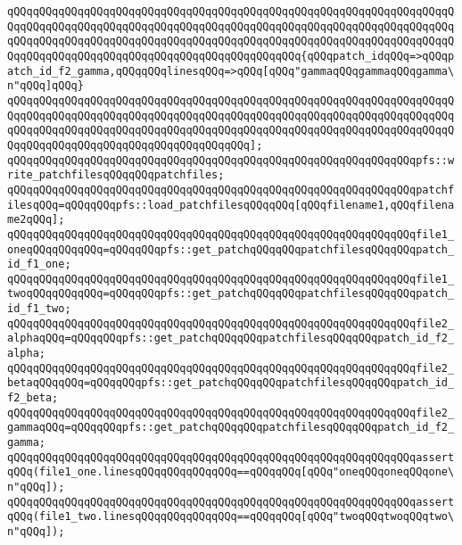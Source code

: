 \verb|qQQqqQQqqQQqqQQqqQQqqQQqqQQqqQQqqQQqqQQqqQQqqQQqqQQqqQQqqQQqqQQqqQQqqQQqqQQqqQQqqQQqqQQqqQQqqQQqqQQqqQQqqQQqqQQqqQQqqQQqqQQqqQQqqQQqqQQqqQQqqQQqqQQqqQQqqQQqqQQqqQQqqQQqqQQqqQQqqQQqqQQqqQQqqQQqqQQqqQQqqQQqqQQqqQQqqQQqqQQqqQQqqQQqqQQqqQQqqQQqqQQqqQQqqQQqqQQq{qQQqpatch_idqQQq=>qQQqpatch_id_f2_gamma,qQQqqQQqlinesqQQq=>qQQq[qQQq"gammaqQQqgammaqQQqgamma\n"qQQq]qQQq}|\newline
\verb|qQQqqQQqqQQqqQQqqQQqqQQqqQQqqQQqqQQqqQQqqQQqqQQqqQQqqQQqqQQqqQQqqQQqqQQqqQQqqQQqqQQqqQQqqQQqqQQqqQQqqQQqqQQqqQQqqQQqqQQqqQQqqQQqqQQqqQQqqQQqqQQqqQQqqQQqqQQqqQQqqQQqqQQqqQQqqQQqqQQqqQQqqQQqqQQqqQQqqQQqqQQqqQQqqQQqqQQqqQQqqQQqqQQqqQQqqQQqqQQqqQQqqQQq];|\newline
\newline
\verb|qQQqqQQqqQQqqQQqqQQqqQQqqQQqqQQqqQQqqQQqqQQqqQQqqQQqqQQqqQQqqQQqpfs::write_patchfilesqQQqqQQqpatchfiles;|\newline
\newline
\verb|qQQqqQQqqQQqqQQqqQQqqQQqqQQqqQQqqQQqqQQqqQQqqQQqqQQqqQQqqQQqqQQqpatchfilesqQQq=qQQqqQQqpfs::load_patchfilesqQQqqQQq[qQQqfilename1,qQQqfilename2qQQq];|\newline
\newline
\verb|qQQqqQQqqQQqqQQqqQQqqQQqqQQqqQQqqQQqqQQqqQQqqQQqqQQqqQQqqQQqqQQqfile1_oneqQQqqQQqqQQq=qQQqqQQqpfs::get_patchqQQqqQQqpatchfilesqQQqqQQqpatch_id_f1_one;|\newline
\verb|qQQqqQQqqQQqqQQqqQQqqQQqqQQqqQQqqQQqqQQqqQQqqQQqqQQqqQQqqQQqqQQqfile1_twoqQQqqQQqqQQq=qQQqqQQqpfs::get_patchqQQqqQQqpatchfilesqQQqqQQqpatch_id_f1_two;|\newline
\newline
\verb|qQQqqQQqqQQqqQQqqQQqqQQqqQQqqQQqqQQqqQQqqQQqqQQqqQQqqQQqqQQqqQQqfile2_alphaqQQq=qQQqqQQqpfs::get_patchqQQqqQQqpatchfilesqQQqqQQqpatch_id_f2_alpha;|\newline
\verb|qQQqqQQqqQQqqQQqqQQqqQQqqQQqqQQqqQQqqQQqqQQqqQQqqQQqqQQqqQQqqQQqfile2_betaqQQqqQQq=qQQqqQQqpfs::get_patchqQQqqQQqpatchfilesqQQqqQQqpatch_id_f2_beta;|\newline
\verb|qQQqqQQqqQQqqQQqqQQqqQQqqQQqqQQqqQQqqQQqqQQqqQQqqQQqqQQqqQQqqQQqfile2_gammaqQQq=qQQqqQQqpfs::get_patchqQQqqQQqpatchfilesqQQqqQQqpatch_id_f2_gamma;|\newline
\newline
\verb|qQQqqQQqqQQqqQQqqQQqqQQqqQQqqQQqqQQqqQQqqQQqqQQqqQQqqQQqqQQqqQQqassertqQQq(file1_one.linesqQQqqQQqqQQqqQQq==qQQqqQQq[qQQq"oneqQQqoneqQQqone\n"qQQq]);|\newline
\verb|qQQqqQQqqQQqqQQqqQQqqQQqqQQqqQQqqQQqqQQqqQQqqQQqqQQqqQQqqQQqqQQqassertqQQq(file1_two.linesqQQqqQQqqQQqqQQq==qQQqqQQq[qQQq"twoqQQqtwoqQQqtwo\n"qQQq]);|\newline
